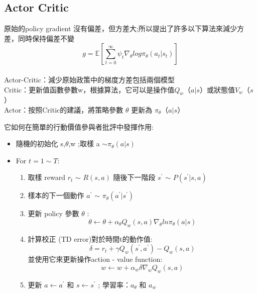 \documentclass[14pt,a4paper]{report}  %
\begin{document}
\subsection{Actor Critic}
原始的policy gradient 沒有偏差，但方差大;所以提出了許多以下算法來減少方差，同時保持偏差不變\\[5pt]
$$g = \mathbb{E}[\sum_{t=0}^\infty\psi_t\nabla_\theta log\pi_\theta(a_t \vert s_t)]$$\\[5pt]
Actor-Critic：減少原始政策中的梯度方差包括兩個模型\\[5pt]
Critic：更新值函數參數w，根據算法，它可以是操作值$ Q_w$（$a \vert s$）或狀態值$V_w$（$s$） \\[5pt]
Actor：按照Critic的建議，將策略參數 $\theta$ 更新為 $\pi_\theta$（$a \vert s$）\\[5pt]
\begin{Large}
它如何在簡單的行動價值參與者批評中發揮作用:
\end{Large}
\begin{itemize}
\item 隨機的初始化 s,$\theta$,w ;取樣 a $\sim
\pi_\theta(a \vert s)$
\end{itemize}
\begin{itemize}
\item For $t =1 \sim T:$ 
\begin{enumerate}[1]
      \item 取樣 reward $r_t$ $\sim$ $R(s,a)$ 隨後下一階段 $s^{'}$ $\sim$ $P(s^{'}\vert s,a)$ 
      \item 樣本的下一個動作 $a^{'}$ $\sim$ $\pi_\theta(a^{'}\vert s^{'})$
    
       \item 更新 policy 參數 $\theta$ :\\
       $$\theta\leftarrow\theta+\alpha_\theta Q_w(s,a)\nabla_\theta ln\pi_\theta(a\vert s)$$
       \item 計算校正 (TD error)對於時間t的動作值:\\
       $$\delta = r_t + \gamma Q_w(s^{'},a^{'})-Q_w(s,a)$$並使用它來更新操作action - value function:\\
       $$w\leftarrow w+\alpha_w \delta \nabla_w Q_w(s,a) $$
       \item 更新 $a\leftarrow a^{'}$ 和 $ s \leftarrow s^{'}$ ; 學習率：$a_\theta$ 和 $a_w$
    \end{enumerate}   
\end{itemize}\newpage
\end{document}
